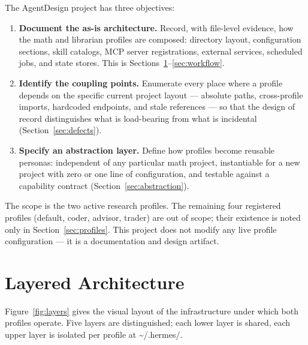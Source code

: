 \documentclass[10pt]{article}
\newcommand{\mono}[1]{{\ttfamily\small #1}}
\begin{document}
The \mono{AgentDesign} project has three objectives:

\begin{enumerate}
    \item \textbf{Document the as-is architecture.} Record, with file-level evidence, how the
    math and librarian profiles are composed: directory layout, configuration sections, skill
    catalogs, MCP server registrations, external services, scheduled jobs, and state stores.
    This is Sections~\ref{sec:layers}--\ref{sec:workflow}.
    \item \textbf{Identify the coupling points.} Enumerate every place where a profile depends
    on the specific current project layout --- absolute paths, cross-profile imports, hardcoded
    endpoints, and stale references --- so that the design of record distinguishes what is
    load-bearing from what is incidental (Section~\ref{sec:defects}).
    \item \textbf{Specify an abstraction layer.} Define how profiles become reusable personas:
    independent of any particular math project, instantiable for a new project with zero or one
    line of configuration, and testable against a capability contract
    (Section~\ref{sec:abstraction}).
\end{enumerate}

The scope is the two active research profiles. The remaining four registered profiles
(\mono{default}, \mono{coder}, \mono{advisor}, \mono{trader}) are out of scope; their existence
is noted only in Section~\ref{sec:profiles}. This project does not modify any live profile
configuration --- it is a documentation and design artifact.

\section{Layered Architecture}\label{sec:layers}

Figure~\ref{fig:layers} gives the visual layout of the infrastructure under which both profiles
operate. Five layers are distinguished; each lower layer is shared, each upper layer is isolated
per profile at \mono{\textasciitilde/.hermes/}\allowbreak\mono{profiles/\textless name\textgreater/}.
\end{document}
